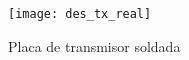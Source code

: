 \begin{figure}[h!]
    \centering
    \texttt{[image: des\_tx\_real]}
    \caption{Placa de transmisor soldada}
    \label{fig:exp_placa_tx}
\end{figure}

% 
% 
